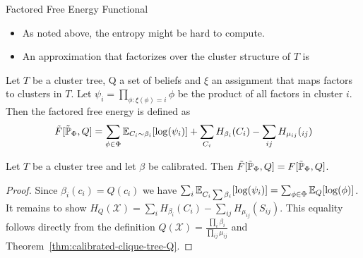 \begin{frame}{Factored Free Energy Functional}
\begin{itemize}
    \item As noted above, the entropy might be hard to compute.
    \pause \item An approximation that factorizes over the cluster structure of $T$ is
\end{itemize}
\pause
\begin{definition}
   Let $T$ be a cluster tree, Q a set of beliefs and $\xi$ an assignment that maps factors to clusters in $T$. 
   Let $\psi_i = \prod_{\phi: \xi(\phi) = i} \phi$ be the product of all factors in cluster $i$.
   Then the factored free energy is defined as
\begin{equation}
        \tilde{F}[\tilde{\Pb}_{\Phi},Q] = \sum_{\phi \in \Phi} \E_{C_i \sim \beta_i}[\log(\psi_i)] + \sum_{C_i} H_{\beta_i}(C_i) - \sum_{ij} H_{\mu_{ij}}(_{ij}) 
\end{equation}
\end{definition}
\pause
\begin{theorem}[Factored Free Energy = Free Energy for calibrated beliefs \& cluster trees]
    \label{thm:factored-equals-free-energy}
    Let $T$ be a cluster tree and let $\beta$ be calibrated.
    Then $\tilde{F}[\tilde{\Pb}_{\Phi},Q] = F[\tilde{\Pb}_{\Phi},Q]$.
\end{theorem}
\pause
\begin{proof}
    Since $\beta_i(c_i) = Q(c_i)$ we have $\sum_i \E_{C_i \sum \beta_i}[\log(\psi_i)] = \sum_{\phi \in \Phi} \E_Q[\log(\phi)]$.
    \pause
    It remains to show $H_Q(\mathcal{X}) = \sum_{i} H_{\beta_i}(C_i) - \sum_{ij}  H_{\mu_{ij}}(S_{ij})$.
    \pause
    This equality follows directly from the definition $Q(\mathcal{X}) = \frac{\prod_i \beta_i}{\prod_{ij} \mu_{ij}}$ and Theorem~\ref{thm:calibrated-clique-tree-Q}.
\end{proof}
\end{frame}

